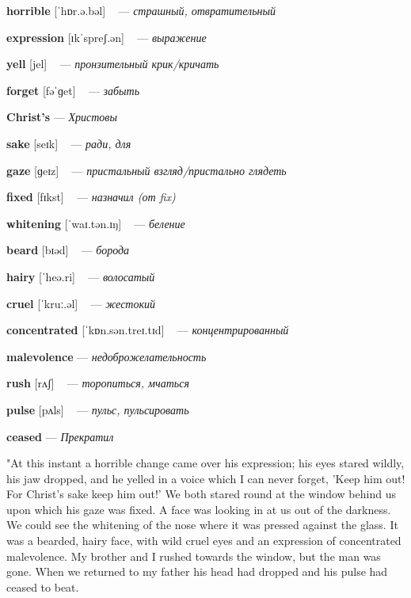 \documentclass[a4paper,oneside,12pt]{amsart}
\begin{document}
{\large 

 {\bf horrible } [ˈhɒr.ə.bəl] ~ --- \emph{ страшный, отвратительный }

{\bf expression } [ɪkˈspreʃ.ən] ~ --- \emph{ выражение }

{\bf yell } [jel] ~ --- \emph{ пронзительный крик/кричать }

{\bf forget } [fəˈɡet] ~ --- \emph{ забыть }

{\bf Christ's } --- \emph{ Христовы }

{\bf sake } [seɪk] ~ --- \emph{ ради, для }

{\bf gaze } [ɡeɪz] ~ --- \emph{ пристальный взгляд/пристально глядеть }

{\bf fixed } [fɪkst] ~ --- \emph{ назначил (от fix) }

{\bf whitening } [ˈwaɪ.tən.ɪŋ] ~ --- \emph{ беление }

{\bf beard } [bɪəd] ~ --- \emph{ борода }

{\bf hairy } [ˈheə.ri] ~ --- \emph{ волосатый }

{\bf cruel } [ˈkruː.əl] ~ --- \emph{ жестокий }

{\bf concentrated } [ˈkɒn.sən.treɪ.tɪd] ~ --- \emph{ концентрированный }

{\bf malevolence } --- \emph{ недоброжелательность }

{\bf rush } [rʌʃ] ~ --- \emph{ торопиться, мчаться }

{\bf pulse } [pʌls] ~ --- \emph{ пульс, пульсировать }

{\bf ceased } --- \emph{ Прекратил }

} \vspace{6mm} {\Large 

 
"At this instant a horrible change came over his expression; his eyes stared wildly, his jaw dropped, and he yelled in a voice which I can never forget, 'Keep him out! For Christ's sake keep him out!' We both stared round at the window behind us upon which his gaze was fixed. A face was looking in at us out of the darkness. We could see the whitening of the nose where it was pressed against the glass. It was a bearded, hairy face, with wild cruel eyes and an expression of concentrated malevolence. My brother and I rushed towards the window, but the man was gone. When we returned to my father his head had dropped and his pulse had ceased to beat.
\\ } 
\end{document}
